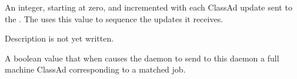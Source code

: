 \begin{description}
\item[\AdAttr{UpdateSequenceNumber}:] An integer, starting at zero,
  and incremented with each ClassAd update sent to the .
  The  uses this value to sequence the updates it
  receives.

\item[\AdAttr{VirtualMemory}:] Description is not yet written.

\item[\AdAttr{WantResAd}:] A boolean value that when 
  causes the  daemon to send to this 
  daemon a full machine ClassAd corresponding to a matched job.


\end{description}

